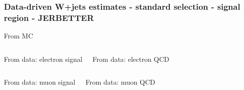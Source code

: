 \documentclass[red,compress,xcolor=table]{beamer}
\begin{document}
\begin{frame}
  \frametitle{Data-driven W+jets estimates - standard selection - signal region - JERBETTER}

\vspace*{-0.5cm}
\begin{block}{\scriptsize From MC}
\begin{center}
    {\tiny
      
    }
\end{center}
  \end{block}

\vspace*{-0.2cm}
\begin{columns}
  \begin{block}{\scriptsize From data: electron signal}
    {\tiny
      
    }
  \end{block}
  \begin{block}{\scriptsize From data: electron QCD}
    {\tiny
      
    }
  \end{block}
\end{columns}
\begin{columns}
  \begin{block}{\scriptsize From data: muon signal}
    {\tiny
      
    }
  \end{block}
  \begin{block}{\scriptsize From data: muon QCD}
    {\tiny
      
    }
  \end{block}
\end{columns}


\end{frame}
\end{document}
